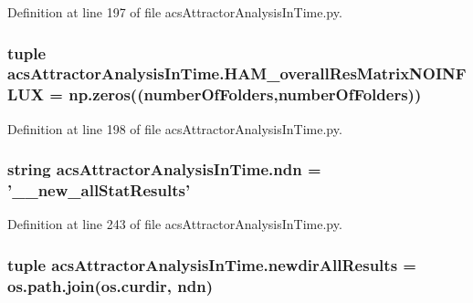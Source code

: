 Definition at line 197 of file acs\-Attractor\-Analysis\-In\-Time.\-py.

\hypertarget{a00097_a6ea74abf4c94200ed1b27d892ecacc97}{
\subsubsection[{H\-A\-M\-\_\-overall\-Res\-Matrix\-N\-O\-I\-N\-F\-L\-U\-X}]{\setlength{\rightskip}{0pt plus 5cm}tuple acs\-Attractor\-Analysis\-In\-Time.\-H\-A\-M\-\_\-overall\-Res\-Matrix\-N\-O\-I\-N\-F\-L\-U\-X = np.\-zeros(({\bf number\-Of\-Folders},{\bf number\-Of\-Folders}))}}\label{a00097_a6ea74abf4c94200ed1b27d892ecacc97}


Definition at line 198 of file acs\-Attractor\-Analysis\-In\-Time.\-py.

\hypertarget{a00097_ab0e0a55161ee1fd9fb0f086a328f67b7}{
\subsubsection[{ndn}]{\setlength{\rightskip}{0pt plus 5cm}string acs\-Attractor\-Analysis\-In\-Time.\-ndn = '\-\_\-\_\-new\-\_\-all\-Stat\-Results'}}\label{a00097_ab0e0a55161ee1fd9fb0f086a328f67b7}


Definition at line 243 of file acs\-Attractor\-Analysis\-In\-Time.\-py.

\hypertarget{a00097_aaf0f6fcbaaf97dcff16b62e86df0209c}{
\subsubsection[{newdir\-All\-Results}]{\setlength{\rightskip}{0pt plus 5cm}tuple acs\-Attractor\-Analysis\-In\-Time.\-newdir\-All\-Results = os.\-path.\-join(os.\-curdir, {\bf ndn})}}\label{a00097_aaf0f6fcbaaf97dcff16b62e86df0209c}


